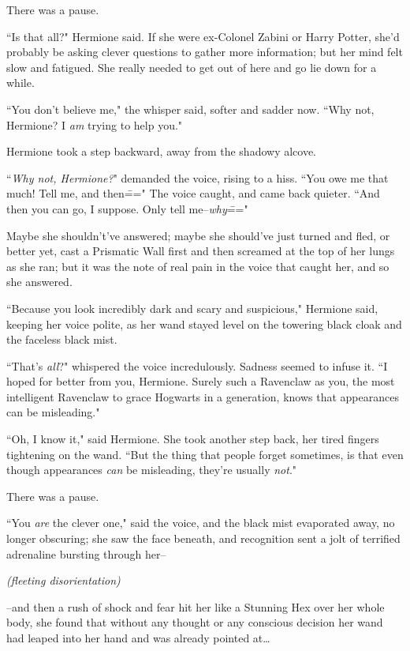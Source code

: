 There was a pause.

``Is that all?" Hermione said. If she were ex-Colonel Zabini or Harry Potter, she'd probably be asking clever questions to gather more information; but her mind felt slow and fatigued. She really needed to get out of here and go lie down for a while.

``You don't believe me," the whisper said, softer and sadder now. ``Why not, Hermione? I \emph{am} trying to help you."

Hermione took a step backward, away from the shadowy alcove.

``\emph{Why not, Hermione?}" demanded the voice, rising to a hiss. ``You owe me that much! Tell me, and then\===" The voice caught, and came back quieter. ``And then you can go, I suppose. Only tell me\---\emph{why}\==="

Maybe she shouldn't've answered; maybe she should've just turned and fled, or better yet, cast a Prismatic Wall first and then screamed at the top of her lungs as she ran; but it was the note of real pain in the voice that caught her, and so she answered.

``Because you look incredibly dark and scary and suspicious," Hermione said, keeping her voice polite, as her wand stayed level on the towering black cloak and the faceless black mist.

``That's \emph{all}?" whispered the voice incredulously. Sadness seemed to infuse it. ``I hoped for better from you, Hermione. Surely such a Ravenclaw as you, the most intelligent Ravenclaw to grace Hogwarts in a generation, knows that appearances can be misleading."

``Oh, I know it," said Hermione. She took another step back, her tired fingers tightening on the wand. ``But the thing that people forget sometimes, is that even though appearances \emph{can} be misleading, they're usually \emph{not}."

There was a pause.

``You \emph{are} the clever one," said the voice, and the black mist evaporated away, no longer obscuring; she saw the face beneath, and recognition sent a jolt of terrified adrenaline bursting through her\---

\emph{(fleeting disorientation)}

\---and then a rush of shock and fear hit her like a Stunning Hex over her whole body, she found that without any thought or any conscious decision her wand had leaped into her hand and was already pointed at{\ldots}

